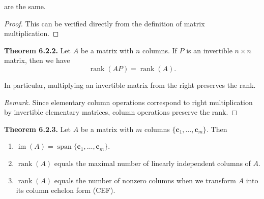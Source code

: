 \documentclass[12pt]{article}
\newenvironment{Remark}
{\begin{proof}[Remark]}
{\end{proof}}
\begin{document}
are the same.

\begin{proof}
This can be verified directly from the definition of matrix multiplication.
\end{proof}

\textbf{Theorem 6.2.2.}
Let $A$ be a matrix with $n$ columns. If $P$ is an invertible
$n\times n$ matrix, then we have
\[
\operatorname{rank}(AP)=\operatorname{rank}(A).
\]

In particular, multiplying an invertible matrix from the right preserves
the rank.
\begin{Remark}
Since elementary column operations correspond to right multiplication
by invertible elementary matrices, column operations preserve the rank.
\end{Remark}

\textbf{Theorem 6.2.3.}
Let $A$ be a matrix with $m$ columns
$\{\mathbf{c}_1,\ldots,\mathbf{c}_m\}$. Then

\begin{enumerate}
    \item $\operatorname{im}(A)=\operatorname{span}\{\mathbf{c}_1,\ldots,\mathbf{c}_m\}$.

    \item $\operatorname{rank}(A)$ equals the maximal number of linearly
    independent columns of $A$.

    \item $\operatorname{rank}(A)$ equals the number of nonzero columns
    when we transform $A$ into its column echelon form (CEF).
\end{enumerate}
\end{document}
